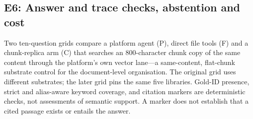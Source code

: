 
\subsection{E6: Answer and trace checks, abstention and cost}
\label{sec:e5}
\label{sec:agentic}\label{sec:abstention}\label{sec:composition}\label{sec:eval-agent}
Two ten-question grids compare a platform agent (P), direct file tools (F)
and a chunk-replica arm (C) that searches an 800-character chunk copy of the
same content through the platform's own vector lane---a same-content,
flat-chunk substrate control for the document-level organisation. The original
grid uses different substrates; the
later grid pins the same five libraries. Gold-ID presence, strict and
alias-aware keyword coverage, and citation markers are deterministic checks,
not assessments of semantic support. A marker does not establish that a cited
passage exists or entails the answer.


